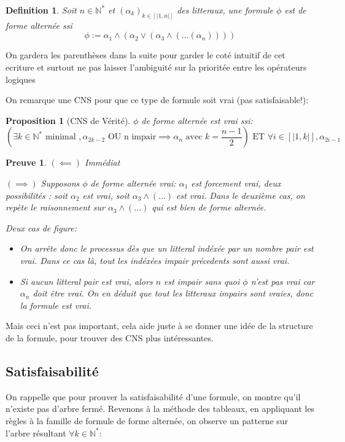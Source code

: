 \documentclass{paper}
\newtheorem{prop}{Proposition}
\newtheorem{defi}{Definition}
\newtheorem{preuve}{Preuve}
\begin{document}
\begin{defi}
Soit $n\in\mathbb{N}^*$ et $(\alpha_k)_{k\in[|1, n|]}$ des litteraux, une formule $\phi$ est de forme alternée ssi
$$\phi := \alpha_1 \land (\alpha_2 \lor (\alpha_3 \land (\dots (\alpha_n))))$$
\end{defi}
On gardera les parenthèses dans la suite pour garder le coté intuitif de cet ecriture et surtout ne pas laisser l'ambiguité sur la prioritée entre les opérateurs logiques


On remarque une CNS pour que ce type de formule soit vrai (pas satisfaisable!):
\begin{prop}[CNS de Vérité]
    $\phi$ de forme alternée est vrai ssi:
    $$(\exists k\in\mathbb{N}^* \text{ minimal }, \alpha_{2k-2} \text{ OU n impair}\implies\alpha_n \text{ avec } k=\frac{n-1}{2})\text{ ET } \forall i\in[|1, k|], \alpha_{2i-1}$$
\end{prop}

\begin{preuve}
    $(\impliedby)$ Immédiat
    
    $(\implies)$ Supposons $\phi$ de forme alternée vrai:
    $\alpha_1$ est forcement vrai, deux possibilités :
    soit $\alpha_2$ est vrai, soit $\alpha_3\land(\dots)$ est vrai. Dans le deuxième cas, on repète le raisonnement sur $\alpha_3\land(\dots)$ qui est bien de forme alternée.
    
    Deux cas de figure:
    \begin{itemize}
        \item On arrête donc le processus dès que un litteral indéxée par un nombre pair est vrai.
        Dans ce cas là, tout les indéxées impair précedents sont aussi vrai.
        \item Si aucun litteral pair est vrai, alors $n$ est impair sans quoi $\phi$ n'est pas vrai car $\alpha_n$ doit être vrai. 
        On en déduit que tout les litteraux impairs sont vraies, donc la formule est vrai.
    \end{itemize}    
\end{preuve}

Mais ceci n'est pas important, cela aide juste à se donner une idée de la structure de la formule, pour trouver des CNS plus intéressantes.



\subsection{Satisfaisabilité}
On rappelle que pour prouver la satisfaisabilité d'une formule, on montre qu'il n'existe pas d'arbre fermé.
Revenons à la méthode des tableaux, en appliquant les règles à la famille de formule de forme alternée,
on observe un patterne sur l'arbre résultant $\forall k\in\mathbb{N}^*$:
\end{document}
